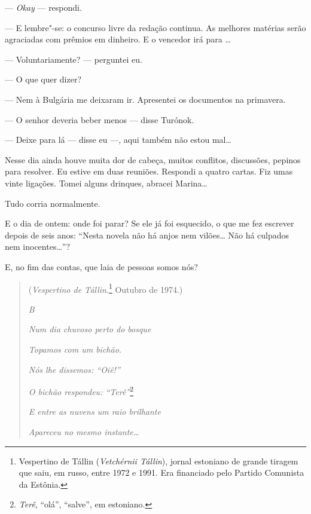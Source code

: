 --- \emph{Okay} --- respondi.

--- E lembre"-se: o concurso livre da redação continua. As melhores
matérias serão agraciadas com prêmios em dinheiro. E o vencedor irá para
\ldots{}

--- Voluntariamente? --- perguntei eu.

--- O que quer dizer?

--- Nem à Bulgária me deixaram ir. Apresentei os documentos na
primavera.

--- O senhor deveria beber menos --- disse Turónok.

--- Deixe para lá --- disse eu ­---, aqui também não estou mal\ldots{}

Nesse dia ainda houve muita dor de cabeça, muitos conflitos, discussões,
pepinos para resolver. Eu estive em duas reuniões. Respondi a quatro
cartas. Fiz umas vinte ligações. Tomei alguns drinques, abracei
Marina\ldots{}

Tudo corria normalmente.

E o dia de ontem: onde foi parar? Se ele já foi esquecido, o que me fez
escrever depois de seis anos: ``Nesta novela não há anjos nem vilões\ldots{}
Não há culpados nem inocentes\ldots{}''?

E, no fim das contas, que laia de pessoas somos nós?

\clearpage
\thispagestyle{empty}

\movetooddpage
\begin{center}
{}
\end{center}

\begin{quotation}
(\emph{Vespertino de Tállin}.\footnote{Vespertino de Tállin
  (\emph{Vetchérnii Tállin}), jornal estoniano de grande tiragem que
  saiu, em russo, entre 1972 e 1991. Era financiado pelo Partido
  Comunista da Estônia.} Outubro de 1974.)
\vspace{4pt}

\emph{B}

\emph{Num dia chuvoso perto do bosque}

\emph{Topamos com um bichão.}

\emph{Nós lhe dissemos: ``Oiê!''}

\emph{O bichão respondeu: ``Terê''}\footnote{\emph{Terê}, ``olá'',
  ``salve'', em estoniano.}

\emph{E entre as nuvens um raio brilhante}

\emph{Apareceu no mesmo instante\ldots{}}
\end{quotation}


